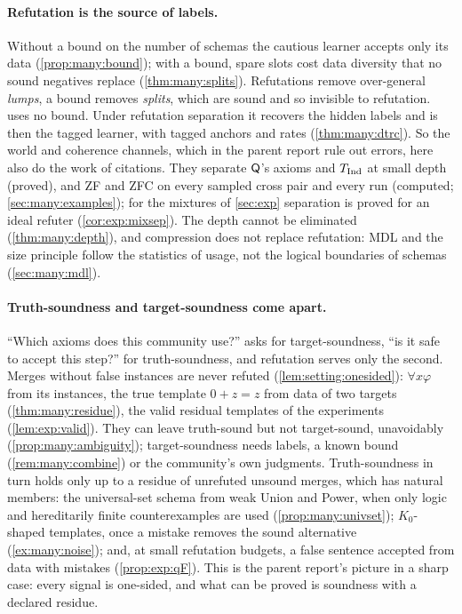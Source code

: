 \paragraph{Refutation is the source of labels.}
Without a bound on the number of schemas the
cautious learner accepts only its data (\cref{prop:many:bound}); with a bound, spare slots cost data diversity that no
sound negatives replace (\cref{thm:many:splits}). Refutations remove over-general \emph{lumps}, a bound removes
\emph{splits}, which are sound and so invisible to refutation. \DTRC{} uses no bound. Under refutation separation it
recovers the hidden labels and is then the tagged learner, with tagged anchors and rates (\cref{thm:many:dtrc}). So the
world and coherence channels, which in the parent report rule out errors, here also do the work of citations. They
separate $\mathsf{Q}$'s axioms and $T_{\mathrm{Ind}}$ at small depth (proved), and ZF and ZFC on every sampled cross pair and every run
(computed; \cref{sec:many:examples}); for the mixtures of \cref{sec:exp} separation is proved for an ideal refuter
(\cref{cor:exp:mixsep}). The depth cannot be eliminated (\cref{thm:many:depth}), and compression does not replace
refutation: MDL \citep{rissanen1978modeling} and the size principle \citep{tenenbaum2001generalization} follow the
statistics of usage, not the logical boundaries of schemas (\cref{sec:many:mdl}).

\paragraph{Truth-soundness and target-soundness come apart.}
``Which axioms does this community use?'' asks for target-soundness, ``is it safe to accept this step?'' for
truth-soundness, and refutation serves only the second. Merges without false instances are never refuted
(\cref{lem:setting:onesided}): $\forall x\varphi$ from its instances, the true template $0+z=z$ from data of two targets
(\cref{thm:many:residue}), the valid residual templates of the experiments (\cref{lem:exp:valid}). They can leave
\DTRC{} truth-sound but not target-sound, unavoidably (\cref{prop:many:ambiguity}); target-soundness needs labels, a known
bound (\cref{rem:many:combine}) or the community's own judgments. Truth-soundness in turn holds only up to a residue of
unrefuted unsound merges, which has natural members: the universal-set schema from weak Union and Power, when only logic
and hereditarily finite counterexamples are used (\cref{prop:many:univset}); $K_0$-shaped templates, once a mistake
removes the sound alternative (\cref{ex:many:noise}); and, at small refutation budgets, a false sentence accepted from
data with mistakes (\cref{prop:exp:qF}). This is the parent report's picture in a sharp case: every signal is
one-sided, and what can be proved is soundness with a declared residue.

